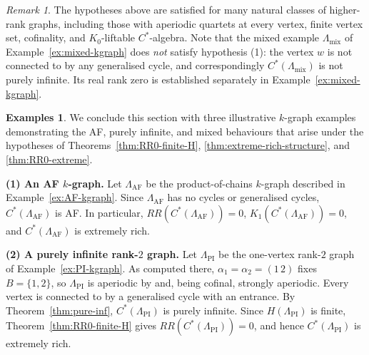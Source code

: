 \documentclass[12pt]{amsart}
\theoremstyle{plain}
\theoremstyle{definition}
\newtheorem{examples}[theorem]{Examples}
\theoremstyle{remark}
\newtheorem{remark}[theorem]{Remark}
\begin{document}
\begin{remark}
The hypotheses above are satisfied for many natural classes of
higher-rank graphs, including those with aperiodic quartets at every
vertex, finite vertex set, cofinality, and $K_0$-liftable
$C^*$-algebra. Note that the mixed example
$\Lambda_{\mathrm{mix}}$ of Example~\ref{ex:mixed-kgraph} does \emph{not}
satisfy hypothesis (1): the vertex $w$ is not connected to by any
generalised cycle, and correspondingly $C^*(\Lambda_{\mathrm{mix}})$ is not
purely infinite. Its real rank zero is established separately in
Example~\ref{ex:mixed-kgraph}.
\end{remark}

\begin{examples}\label{ex:5.5}
We conclude this section with three illustrative $k$-graph examples
demonstrating the AF, purely infinite, and mixed behaviours that arise
under the hypotheses of Theorems~\ref{thm:RR0-finite-H},
\ref{thm:extreme-rich-structure}, and \ref{thm:RR0-extreme}.

\smallskip

\noindent\textbf{(1) An AF $k$-graph.}
Let $\Lambda_{\mathrm{AF}}$ be the product-of-chains $k$-graph described in
Example~\ref{ex:AF-kgraph}. Since $\Lambda_{\mathrm{AF}}$ has no cycles or
generalised cycles, $C^*(\Lambda_{\mathrm{AF}})$ is AF. In particular,
$RR(C^*(\Lambda_{\mathrm{AF}}))=0$, $K_1(C^*(\Lambda_{\mathrm{AF}}))=0$, and
$C^*(\Lambda_{\mathrm{AF}})$ is extremely rich.

\smallskip

\noindent\textbf{(2) A purely infinite rank-$2$ graph.}
Let $\Lambda_{\mathrm{PI}}$ be the one-vertex rank-$2$ graph of
Example~\ref{ex:PI-kgraph}. As computed there, $\alpha_1=\alpha_2=(1\,2)$
fixes $B=\{1,2\}$, so $\Lambda_{\mathrm{PI}}$ is aperiodic by
\cite[Corollary~4.1]{DY} and, being cofinal, strongly aperiodic. Every
vertex is connected to by a generalised cycle with an entrance. By Theorem~\ref{thm:pure-inf},
$C^*(\Lambda_{\mathrm{PI}})$ is purely infinite. Since $H(\Lambda_{\mathrm{PI}})$
is finite, Theorem~\ref{thm:RR0-finite-H} gives $RR(C^*(\Lambda_{\mathrm{PI}}))=0$,
and hence $C^*(\Lambda_{\mathrm{PI}})$ is extremely rich.

\smallskip


\end{examples}
\end{document}
